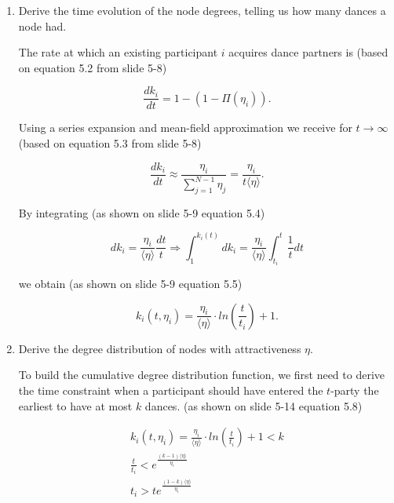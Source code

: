 \begin{enumerate}
	\item Derive the time evolution of the node degrees, telling us how many dances a node had.
	
	The rate at which an existing participant $i$ acquires dance partners is (based on equation 5.2 from slide 5-8)
	
	\begin{equation*}
		 \frac{dk_i}{dt} = 1 - (1 - \Pi(\eta_i)).
	\end{equation*}

	Using a series expansion and mean-field approximation we receive for $t \rightarrow \infty$ (based on equation 5.3 from slide 5-8)
	
	\begin{equation*}
		\frac{dk_i}{dt} \approx \frac{\eta_i}{\sum_{j=1}^{N-1} \eta_j} = \frac{\eta_i}{t \langle \eta \rangle}.
	\end{equation*}

	By integrating (as shown on slide 5-9 equation 5.4)
	
	\begin{equation*}
		dk_i = \frac{\eta_i}{\langle \eta \rangle} \frac{dt}{t} \Rightarrow \int_{1}^{k_i(t)} dk_i = \frac{\eta_i}{\langle \eta \rangle} \int_{t_i}^{t} \frac{1}{t} dt
	\end{equation*}

	we obtain (as shown on slide 5-9 equation 5.5)
	
	\begin{equation*}
		k_i(t, \eta_i) = \frac{\eta_i}{\langle \eta \rangle} \cdot ln(\frac{t}{t_i}) + 1.
	\end{equation*}
	
	\item Derive the degree distribution of nodes with attractiveness $\eta$.
	
	To build the cumulative degree distribution function, we first need to derive the time constraint when a participant should have entered the $t$-party the earliest to have at most $k$ dances. (as shown on slide 5-14 equation 5.8)
	
	\begin{equation*}
		\begin{split}
			k_i(t, \eta_i) = \frac{\eta_i}{\langle \eta \rangle} \cdot ln(\frac{t}{t_i}) + 1 < k \\
			\frac{t}{t_i} < e^{\frac{(k - 1) \langle \eta \rangle}{\eta_i}} \\
			t_i > t e^{\frac{(1 - k) \langle \eta \rangle}{\eta_i}}
		\end{split}
	\end{equation*}


\end{enumerate}

